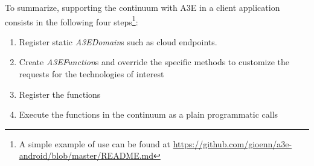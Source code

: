 To summarize, supporting the continuum with A3E in a client application consists in the following four steps\footnote{A simple example of use can be found at \url{https://github.com/gioenn/a3e-android/blob/master/README.md}}:

\begin{enumerate}
	\item Register static \textit{A3EDomain}s such as cloud endpoints.
	\item Create \textit{A3EFunction}s and override the specific methods to customize the requests for the technologies of interest
	\item Register the functions
	\item Execute the functions in the continuum as a plain programmatic calls 
\end{enumerate}
